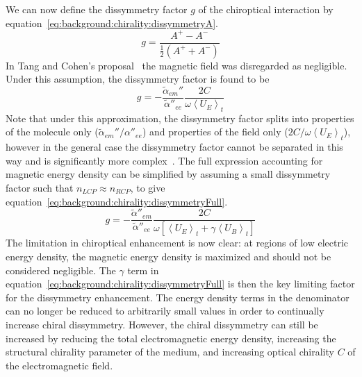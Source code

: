 We can now define the dissymmetry factor $g$ of the chiroptical interaction by equation~\ref{eq:background:chirality:dissymmetryA}.
\begin{equation}\label{eq:background:chirality:dissymmetryA}
    g = \frac{{{A^ + } - {A^ - }}}{\frac{1}{2}({A^ + } + {A^ - })}
\end{equation}
In Tang and Cohen's proposal~\cite{Tang2010} the magnetic field was disregarded as negligible. Under this assumption, the dissymmetry factor is found to be 
\begin{equation}\label{eq:background:chirality:dissymmetryG}
    g =  - \frac{{{\tilde \alpha }_{em}''}}{{\tilde \alpha ''}_{ee}}\frac{{2C}}{{\omega {{\left\langle {{U_E}} \right\rangle }_t}}}
\end{equation}
Note that under this approximation, the dissymmetry factor splits into properties of the molecule only (${{\tilde \alpha }_{em}''}/{{\alpha }''}_{ee}$) and properties of the field only (${2C}/{\omega {{\left\langle {{U}_{E}} \right\rangle }_{t}}}$), however in the general case the dissymmetry factor cannot be separated in this way and is significantly more complex~\cite{Choi2012}.
The full expression accounting for magnetic energy density can be simplified by assuming a small dissymmetry factor such that $n_{LCP} \approx n_{RCP}$, to give equation~\ref{eq:background:chirality:dissymmetryFull}.~\cite{Choi2012}
\begin{equation}\label{eq:background:chirality:dissymmetryFull}
    g =  - \frac{{\tilde \alpha ''}_{em}}{{{\tilde \alpha ''}_{ee}}}\frac{{2C}}{{\omega [{{\left\langle {{U_E}} \right\rangle }_t} + \gamma {{\left\langle {{U_B}} \right\rangle }_t}]}}
\end{equation}
The limitation in chiroptical enhancement is now clear: at regions of low electric energy density, the magnetic energy density is maximized and should not be considered negligible. The $\gamma$ term in equation~\ref{eq:background:chirality:dissymmetryFull} is then the key limiting factor for the dissymmetry enhancement. The energy density terms in the denominator can no longer be reduced to arbitrarily small values in order to continually increase chiral dissymmetry. However, the chiral dissymmetry can still be increased by reducing the total electromagnetic energy density, increasing the structural chirality parameter of the medium, and increasing optical chirality $C$ of the electromagnetic field. 

